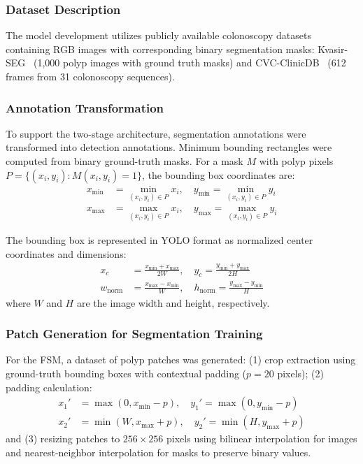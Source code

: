 \documentclass[conference]{IEEEtran}
\begin{document}
\subsubsection{Dataset Description}
The model development utilizes publicly available colonoscopy datasets containing RGB images with corresponding binary segmentation masks: Kvasir-SEG~\cite{jha2020} (1,000 polyp images with ground truth masks) and CVC-ClinicDB~\cite{bernal2015} (612 frames from 31 colonoscopy sequences).

\subsubsection{Annotation Transformation}
To support the two-stage architecture, segmentation annotations were transformed into detection annotations. Minimum bounding rectangles were computed from binary ground-truth masks. For a mask $M$ with polyp pixels $P = \{(x_i, y_i) : M(x_i, y_i) = 1\}$, the bounding box coordinates are:
\begin{align}
    x_{\min} &= \min_{(x_i, y_i) \in P} x_i, \quad y_{\min} = \min_{(x_i, y_i) \in P} y_i \\
    x_{\max} &= \max_{(x_i, y_i) \in P} x_i, \quad y_{\max} = \max_{(x_i, y_i) \in P} y_i
\end{align}

The bounding box is represented in YOLO format as normalized center coordinates and dimensions:
\begin{align}
    x_c &= \frac{x_{\min} + x_{\max}}{2W}, \quad y_c = \frac{y_{\min} + y_{\max}}{2H} \\
    w_{\text{norm}} &= \frac{x_{\max} - x_{\min}}{W}, \quad h_{\text{norm}} = \frac{y_{\max} - y_{\min}}{H}
\end{align}
where $W$ and $H$ are the image width and height, respectively.

\subsubsection{Patch Generation for Segmentation Training}
For the FSM, a dataset of polyp patches was generated: (1) crop extraction using ground-truth bounding boxes with contextual padding ($p = 20$ pixels); (2) padding calculation:
\begin{align}
    x_1' &= \max(0, x_{\min} - p), \quad y_1' = \max(0, y_{\min} - p) \\
    x_2' &= \min(W, x_{\max} + p), \quad y_2' = \min(H, y_{\max} + p)
\end{align}
and (3) resizing patches to $256 \times 256$ pixels using bilinear interpolation for images and nearest-neighbor interpolation for masks to preserve binary values.
\end{document}
